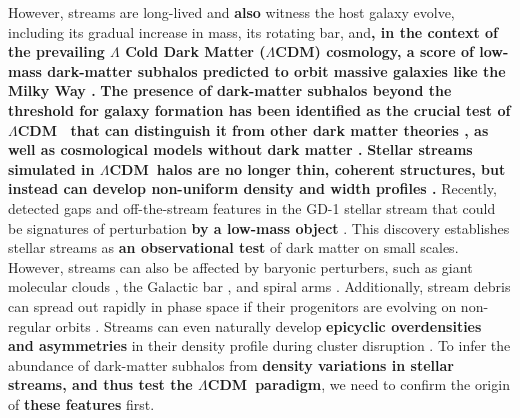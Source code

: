 \documentclass[twocolumn]{aastex62}
\newcommand{\lcdm}{$\Lambda$CDM}
\newcommand{\changes}[1]{{\textbf{#1}}}
\begin{document}
However, streams are long-lived and \changes{also} witness the host galaxy evolve, including its gradual increase in mass, its rotating bar, and\changes{, in the context of the prevailing $\Lambda$ Cold Dark Matter (\lcdm) cosmology, a score of low-mass dark-matter subhalos predicted to orbit massive galaxies like the Milky Way \citep[e.g.,][]{Diemand:2008, Springel:2008}.}
\changes{The presence of dark-matter subhalos beyond the threshold for galaxy formation has been identified as the crucial test of \lcdm\ \citep{Bullock:2017} that can distinguish it from other dark matter theories \citep[e.g.,][]{Hu:2000, Bode:2001}, as well as cosmological models without dark matter \citep[e.g.,][]{Milgrom:1983}.}
\changes{Stellar streams simulated in \lcdm\ halos are no longer thin, coherent structures, but instead can develop non-uniform density and width profiles \citep[e.g.,][]{Bonaca:2014, Ngan:2015}.}
Recently, \citet{Price-Whelan:2018} detected gaps and off-the-stream features in the GD-1 stellar stream that could be signatures of perturbation \changes{by a low-mass object} \citep{Bonaca:2018b}.
This discovery establishes stellar streams as \changes{an observational test} of dark matter on small scales.
However, streams can also be affected by baryonic perturbers, such as giant molecular clouds \citep{Amorisco:2016}, the Galactic bar \citep{Pearson:2017}, and spiral arms \citep{Banik:2019}.
Additionally, stream debris can spread out rapidly in phase space if their progenitors are evolving on non-regular orbits \citep[e.g.,][]{Pearson:2015, Fardal:2015, Price-Whelan:2016, Price-Whelan:2016b}.
Streams can even naturally develop \changes{epicyclic overdensities and asymmetries} in their density profile during cluster disruption \citep[e.g.,][]{Kupper:2008, Just:2009, Kupper:2010}.
To infer the abundance of dark-matter subhalos from \changes{density variations in stellar streams, and thus test the \lcdm\ paradigm}, we need to confirm the origin of \changes{these features} first.
\end{document}
